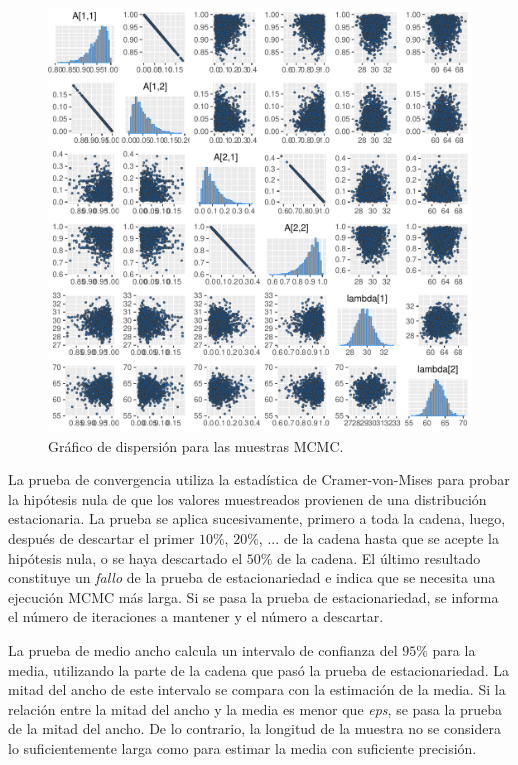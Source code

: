 \documentclass[a4paper]{article}\usepackage[]{graphicx}\usepackage[]{color}
\makeatletter
\def\maxwidth{ %
  \ifdim\Gin@nat@width>\linewidth
    \linewidth
  \else
    \Gin@nat@width
  \fi
}
\newenvironment{knitrout}{}{} %
\makeatother
\begin{document}
\vspace{5mm} %

\begin{knitrout}
\color{fgcolor}\begin{figure}
\includegraphics[width=\maxwidth]{figure/unnamed-chunk-32-1} \caption[Gráfico de dispersión para las muestras MCMC]{Gráfico de dispersión para las muestras MCMC.}\label{fig:unnamed-chunk-32}
\end{figure}


\end{knitrout}

La prueba de convergencia utiliza la estadística de Cramer-von-Mises para probar la hipótesis nula de que los valores muestreados provienen de una distribución estacionaria. La prueba se aplica sucesivamente, primero a toda la cadena, luego, después de descartar el primer $10 \%$, $20 \%$, ... de la cadena hasta que se acepte la hipótesis nula, o se haya descartado el $50 \%$ de la cadena. El último resultado constituye un \emph{fallo} de la prueba de estacionariedad e indica que se necesita una ejecución MCMC más larga. Si se pasa la prueba de estacionariedad, se informa el número de iteraciones a mantener y el número a descartar.

La prueba de medio ancho calcula un intervalo de confianza del $95 \%$ para la media, utilizando la parte de la cadena que pasó la prueba de estacionariedad. La mitad del ancho de este intervalo se compara con la estimación de la media. Si la relación entre la mitad del ancho y la media es menor que \emph{eps}, se pasa la prueba de la mitad del ancho. De lo contrario, la longitud de la muestra no se considera lo suficientemente larga como para estimar la media con suficiente precisión.
\end{document}
